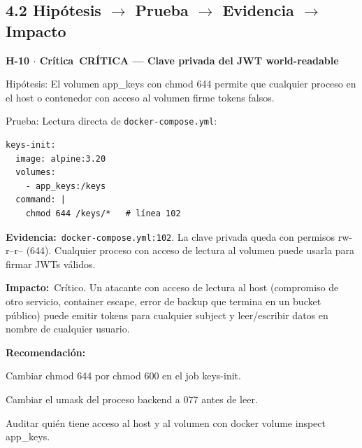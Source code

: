 \documentclass[10pt,a4paper]{article}
\newcommand{\code}[1]{\nolinkurl{#1}}
\newcommand{\badgeCritica}{\colorbox{red!20}{\textcolor{red!80!black}{\textbf{\footnotesize Crítica}}}}
\begin{document}
\subsection{4.2 Hipótesis \texorpdfstring{$\rightarrow$}{->} Prueba \texorpdfstring{$\rightarrow$}{->} Evidencia \texorpdfstring{$\rightarrow$}{->} Impacto}
\vspace{0.8em}\noindent\textbf{\large H-10 $\cdot$ \badgeCritica\  CRÍTICA --- Clave privada del JWT world-readable}\par\vspace{0.3em}
Hipótesis: El volumen app\_keys con chmod 644 permite que cualquier proceso en el host o contenedor con acceso al volumen firme tokens falsos.\par\vspace{0.4em}
Prueba: Lectura directa de \code{docker-compose.yml}:\par\vspace{0.4em}
\begin{tcolorbox}[colback=codebg,colframe=gray!40,arc=1mm]\small
\begin{verbatim}
keys-init:
  image: alpine:3.20
  volumes:
    - app_keys:/keys
  command: |
    chmod 644 /keys/*   # línea 102
\end{verbatim}
\end{tcolorbox}\vspace{0.4em}
\noindent\textbf{Evidencia:}\ \code{docker-compose.yml:102}. La clave privada queda con permisos rw-r--r-- (644). Cualquier proceso con acceso de lectura al volumen puede usarla para firmar JWTs válidos.\par\vspace{0.4em}
\noindent\textbf{Impacto:}\ Crítico. Un atacante con acceso de lectura al host (compromiso de otro servicio, container escape, error de backup que termina en un bucket público) puede emitir tokens para cualquier subject y leer/escribir datos en nombre de cualquier usuario.\par\vspace{0.4em}
\noindent\textbf{Recomendación:}\ \par\vspace{0.4em}
Cambiar chmod 644 por chmod 600 en el job keys-init.\par\vspace{0.4em}
Cambiar el umask del proceso backend a 077 antes de leer.\par\vspace{0.4em}
Auditar quién tiene acceso al host y al volumen con docker volume inspect app\_keys.\par\vspace{0.4em}
\end{document}
